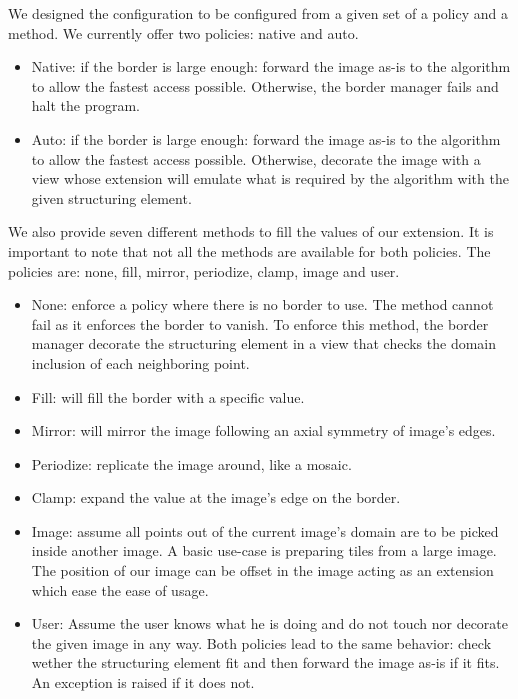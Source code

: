 We designed the configuration to be configured from a given set of a policy and a method. We currently offer two
policies: native and auto.

\begin{itemize}
  \item Native: if the border is large enough: forward the image as-is to the algorithm to allow the fastest access
        possible. Otherwise, the border manager fails and halt the program.
  \item Auto: if the border is large enough: forward the image as-is to the algorithm to allow the fastest access
        possible. Otherwise, decorate the image with a view whose extension will emulate what is required by the algorithm
        with the given structuring element.
\end{itemize}

We also provide seven different methods to fill the values of our extension. It is important to note that not all the
methods are available for both policies. The policies are: none, fill, mirror, periodize, clamp, image and user.

\begin{itemize}
  \item None: enforce a policy where there is no border to use. The method cannot fail as it enforces the border to
        vanish. To enforce this method, the border manager decorate the structuring element in a view that checks the domain
        inclusion of each neighboring point.
  \item Fill: will fill the border with a specific value.
  \item Mirror: will mirror the image following an axial symmetry of image's edges.
  \item Periodize: replicate the image around, like a mosaic.
  \item Clamp: expand the value at the image's edge on the border.
  \item Image: assume all points out of the current image's domain are to be picked inside another image. A basic
        use-case is preparing tiles from a large image. The position of our image can be offset in the image acting as an
        extension which ease the ease of usage.
  \item User: Assume the user knows what he is doing and do not touch nor decorate the given image in any way. Both
        policies lead to the same behavior: check wether the structuring element fit and then forward the image as-is if it
        fits. An exception is raised if it does not.
\end{itemize}

